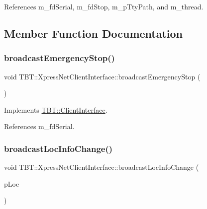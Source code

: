 References m\+\_\+fd\+Serial, m\+\_\+fd\+Stop, m\+\_\+p\+Tty\+Path, and m\+\_\+thread.



\subsection{Member Function Documentation}
\mbox{\label{classTBT_1_1XpressNetClientInterface_a143641241f4830f22ec5beb78036ce4c_a143641241f4830f22ec5beb78036ce4c}} 
\subsubsection{\texorpdfstring{broadcast\+Emergency\+Stop()}{broadcastEmergencyStop()}}
{\footnotesize\ttfamily void T\+B\+T\+::\+Xpress\+Net\+Client\+Interface\+::broadcast\+Emergency\+Stop (\begin{DoxyParamCaption}\item[{void}]{ }\end{DoxyParamCaption})\hspace{0.3cm}{\ttfamily [virtual]}}



Implements \hyperlink{classTBT_1_1ClientInterface_a8d19220baccb47a7c9f45d0288bebcb8_a8d19220baccb47a7c9f45d0288bebcb8}{T\+B\+T\+::\+Client\+Interface}.



References m\+\_\+fd\+Serial.

\mbox{\label{classTBT_1_1XpressNetClientInterface_a8e64404cb84913c2d9290d2afb882b39_a8e64404cb84913c2d9290d2afb882b39}} 
\subsubsection{\texorpdfstring{broadcast\+Loc\+Info\+Change()}{broadcastLocInfoChange()}}
{\footnotesize\ttfamily void T\+B\+T\+::\+Xpress\+Net\+Client\+Interface\+::broadcast\+Loc\+Info\+Change (\begin{DoxyParamCaption}\item[{\hyperlink{classTBT_1_1LocDecoder}{Loc\+Decoder} $\ast$}]{p\+Loc }\end{DoxyParamCaption})\hspace{0.3cm}{\ttfamily [virtual]}}




